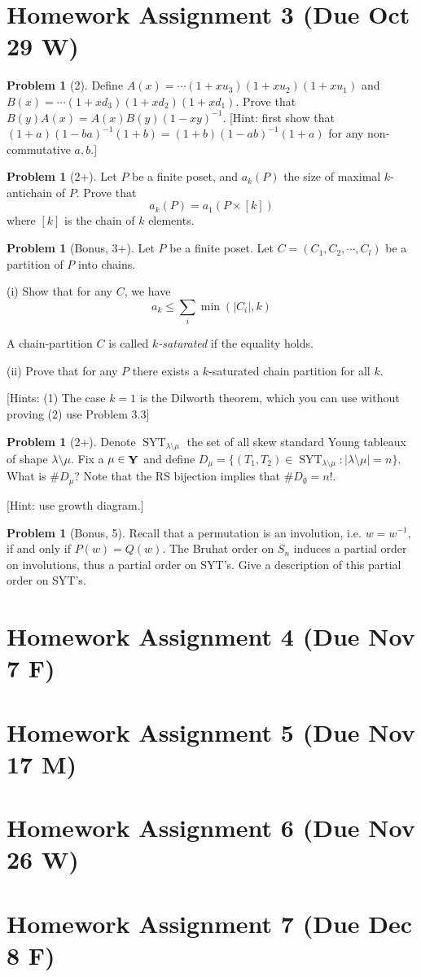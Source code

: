 \documentclass{amsart}
\theoremstyle{plain}
\theoremstyle{definition}
\newtheorem{problem}[theorem]{Problem}
\DeclareMathOperator{\Y}{\bf{Y}}
\DeclareMathOperator{\SYT}{SYT}
\begin{document}
	\section{Homework Assignment 3 (Due Oct 29 W)}
	\begin{problem}[2]
	Define $A(x)=\cdots (1+x u_3)(1+x u_2)(1+x u_1)$ and $B(x)=\cdots (1+x d_3)(1+x d_2)(1+x d_1)$. Prove that $B(y)A(x)=A(x)B(y)(1-xy)^{-1}$. 
	[Hint: first show that $(1+a)(1-ba)^{-1}(1+b)=(1+b)(1-ab)^{-1}(1+a)$ for any non-commutative $a,b$.]
\end{problem}
\begin{problem}[2+]
	Let $P$ be a finite poset, and $a_k(P)$ the size of maximal $k$-antichain of $P$. Prove that
	\[a_k(P)=a_1(P\times[k])\]
	where $[k]$ is the chain of $k$ elements.
\end{problem}
\begin{problem}[Bonus, 3+]
	Let $P$ be a finite poset. Let $C=(C_1,C_2,\cdots,C_l)$ be a partition of $P$ into chains. 
	
	(i) Show that for any $C$, we have
	\[a_k\leq \sum_i \min(|C_i|,k)\]
	
	A chain-partition $C$ is called \emph{$k$-saturated} if the equality  holds. 
	
	(ii) Prove that for any $P$ there exists a $k$-saturated chain partition for all $k$. 
	
	[Hints: (1) The case $k=1$ is the Dilworth theorem, which you can use without proving (2) use Problem 3.3]
\end{problem}
\begin{problem}[2+]
		Denote $\SYT_{\lambda\setminus \mu}$ the set of all skew standard Young tableaux of shape $\lambda\setminus \mu$. Fix a $\mu\in\Y$ and define	\(D_\mu=\{(T_1,T_2)\in \SYT_{\lambda\setminus \mu}:|\lambda\setminus \mu|=n\}\).
		What is $\# D_\mu$? Note that the RS bijection implies that $\# D_{\emptyset}=n!$.
	
	[Hint: use growth diagram.]
	\end{problem}

\begin{problem}[Bonus, 5]
	Recall that a permutation is an involution, i.e. $w=w^{-1}$, if and only if $P(w)=Q(w)$. The Bruhat order on $S_n$ induces a partial order on involutions, thus a partial order on SYT's. Give a description of this partial order on SYT's.
\end{problem}
	\section{Homework Assignment 4 (Due Nov 7 F)}
	\section{Homework Assignment 5 (Due Nov 17 M)}
	\section{Homework Assignment 6 (Due Nov 26 W)}
	\section{Homework Assignment 7 (Due Dec 8 F)}


	
	
	
	
	
	
	
	
\end{document}
